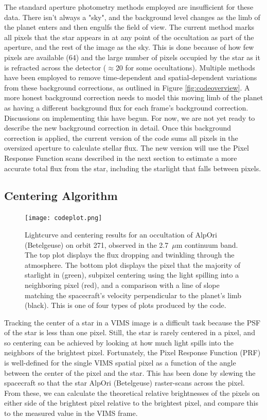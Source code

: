 \documentclass[12pt]{article}
\begin{document}
The standard aperture photometry methods employed are insufficient for these
data. There isn't always a "sky", and the background level changes as the limb
of the planet enters and then engulfs the field of view. The current method
marks all pixels that the star appears in at any point of the occultation as
part of the aperture, and the rest of the image as the sky. This is done
because of how few pixels are available (64) and the large number of pixels
occupied by the star as it is refracted across the detector ($\approx$20 for
some occultations). Multiple methods have been employed to remove
time-dependent and spatial-dependent variations from these background
corrections, as outlined in Figure \ref{fig:codeoverview}. A more honest
background correction needs to model this moving limb of the planet as having a
different background flux for each frame's background correction.  Discussions
on implementing this have begun. For now, we are not yet ready to describe the
new background correction in detail. Once this background correction is
applied, the current version of the code sums all pixels in the oversized
aperture to calculate stellar flux. The new version will use the Pixel Response
Function scans described in the next section to estimate a more accurate total
flux from the star, including the starlight that falls between pixels.

\subsection{Centering Algorithm}

\begin{figure}[h!]
  \centering
  \texttt{[image: codeplot.png]}
  \caption{Lightcurve and centering results for an occultation of AlpOri
(Betelgeuse) on orbit 271, observed in the 2.7~$\mu$m continuum band. The top
plot displays the flux dropping and twinkling through the atmosphere. The
bottom plot displays the pixel that the majority of starlight in (green),
subpixel centering using the light spilling into a neighboring pixel (red),
and a comparison with a line of slope matching the spacecraft's velocity perpendicular
to the planet's limb (black).  This is one of four types of plots produced by
the code.}
  \label{fig:codeplots}
\end{figure}

Tracking the center of a star in a VIMS image is a difficult task because the
PSF of the star is less than one pixel. Still, the star is rarely centered in a
pixel, and so centering can be achieved by looking at how much light spills
into the neighbors of the brightest pixel. Fortunately, the Pixel Response
Function (PRF) is well-defined for the single VIMS spatial pixel as a function
of the angle between the center of the pixel and the star. This has been done
by slewing the spacecraft so that the star AlpOri (Betelgeuse) raster-scans
across the pixel. From these, we can calculate the theoretical relative
brightnesses of the pixels on either side of the brightest pixel relative to
the brightest pixel, and compare this to the measured value in the VIMS frame.
\end{document}

